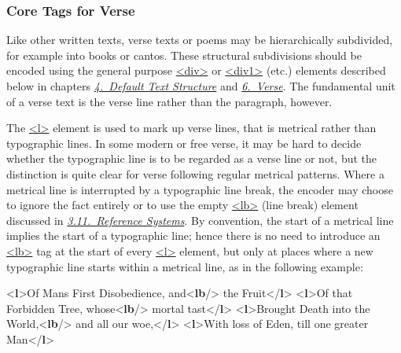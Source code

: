 \subsubsection[{Core Tags for Verse}]{Core Tags for Verse}\label{COVE}\par
Like other written texts, verse texts or poems may be hierarchically subdivided, for example into books or cantos. These structural subdivisions should be encoded using the general purpose \hyperref[TEI.div]{<div>} or \hyperref[TEI.div1]{<div1>} (etc.) elements described below in chapters \textit{\hyperref[DS]{4.\ Default Text Structure}} and \textit{\hyperref[VE]{6.\ Verse}}. The fundamental unit of a verse text is the verse line rather than the paragraph, however.\par
The \hyperref[TEI.l]{<l>} element is used to mark up verse lines, that is metrical rather than typographic lines. In some modern or free verse, it may be hard to decide whether the typographic line is to be regarded as a verse line or not, but the distinction is quite clear for verse following regular metrical patterns. Where a metrical line is interrupted by a typographic line break, the encoder may choose to ignore the fact entirely or to use the empty \hyperref[TEI.lb]{<lb>} (line break) element discussed in \textit{\hyperref[CORS]{3.11.\ Reference Systems}}. By convention, the start of a metrical line implies the start of a typographic line; hence there is no need to introduce an \hyperref[TEI.lb]{<lb>} tag at the start of every \hyperref[TEI.l]{<l>} element, but only at places where a new typographic line starts within a metrical line, as in the following example: \par\bgroup{}\exampleFont \begin{shaded}\noindent\mbox{}{<\textbf{l}>}Of Mans First Disobedience, and{<\textbf{lb}/>} the Fruit{</\textbf{l}>}\mbox{}\newline 
{<\textbf{l}>}Of that Forbidden Tree, whose{<\textbf{lb}/>} mortal tast{</\textbf{l}>}\mbox{}\newline 
{<\textbf{l}>}Brought Death into the World,{<\textbf{lb}/>} and all our woe,{</\textbf{l}>}\mbox{}\newline 
{<\textbf{l}>}With loss of Eden, till one greater Man{</\textbf{l}>}\mbox{}\newline 

\end{shaded}
